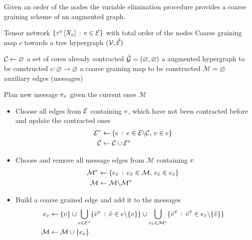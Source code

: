 Given an order of the nodes the variable elimination procedure provides a coarse graining scheme of an augmented graph.


\begin{algorithm}[hbt!]
    \caption{Variable Elimination}\label{alg:variableElimination}
    \begin{algorithmic}
        \Require Tensor network $\left\{\tau^{e}\left[X_{e}\right]\,:\,e\in\mathcal{E}\right\}$ with total order of the nodes
        \Ensure Coarse graining map $c$ towards a tree hypergraph $(\mathcal{V},\tilde{\mathcal{E}})$

        \iosepline
        \State $\mathcal{C}\leftarrow\varnothing$ a set of cores already contracted
        \State $\tilde{\mathcal{G}}=(\varnothing,\varnothing)$ a augmented hypergraph to be constructed
        \State $c:\varnothing\rightarrow\varnothing$ a coarse graining map to be constructed
        \State $\mathcal{M}=\varnothing$ auxiliary edges (messages)


             Plan new message $e_{v}$ given the current ones $\mathcal{M}$
            \begin{itemize}
                \item Choose all edges from $\mathcal{E}$ containing $v$, which have not been contracted before and update the contracted ones
                \begin{align*}
                    \mathcal{E}^{v} &\leftarrow \{e \,:\, e\in\mathcal{E}\backslash\mathcal{C} ,\, v\in e \} \\
                    \mathcal{C} & \leftarrow \mathcal{C} \cup \mathcal{E}^{v}
                \end{align*}
                \item Choose and remove all message edges from $\mathcal{M}$ containing $v$
                \begin{align*}
                    \mathcal{M}^{v} & \leftarrow \{e_{\tilde{v}} \,:\, e_{\tilde{v}} \in \mathcal{M},\, v_{\tilde{v}}\in e_{\tilde{v}} \} \\
                    \mathcal{M} & \leftarrow \mathcal{M}\backslash\mathcal{M}^{v}
                \end{align*}
                \item Build a coarse grained edge and add it to the messages
                \begin{align*}
                    e_{v} &\leftarrow
                    \{v\} \cup
                    \bigcup_{e\in\mathcal{E}^{v}} \{\bar{v}^{v} \,:\, \bar{v}\in e\backslash\{v\} \} \cup
                    \bigcup_{e_{\tilde{v}}\in\mathcal{M}^{v}} \{\bar{v}^{\tilde{v}} \,:\, \bar{v}^{\tilde{v}}\in e_{\tilde{v}}\backslash\{\tilde{v}\} \} \\
                    \mathcal{M} &\leftarrow \mathcal{M} \cup \{e_{v}\}
                \end{align*}
            \end{itemize}


\end{algorithmic}
\end{algorithm}
